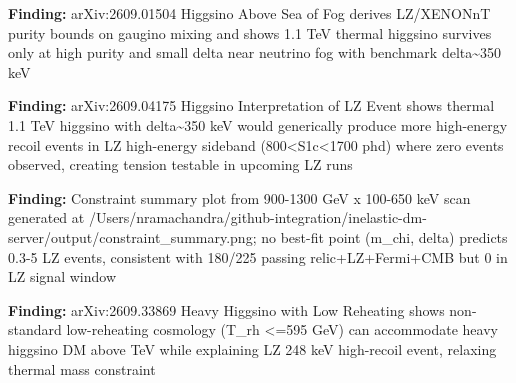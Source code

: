 \documentclass[11pt,a4paper]{article}
\begin{document}
\textbf{Finding:} arXiv:2609.01504 Higgsino Above Sea of Fog derives LZ/XENONnT purity bounds on gaugino mixing and shows 1.1 TeV thermal higgsino survives only at high purity and small delta near neutrino fog with benchmark delta\textasciitilde{}350 keV

\textbf{Finding:} arXiv:2609.04175 Higgsino Interpretation of LZ Event shows thermal 1.1 TeV higgsino with delta\textasciitilde{}350 keV would generically produce more high-energy recoil events in LZ high-energy sideband (800\textless{}S1c\textless{}1700 phd) where zero events observed, creating tension testable in upcoming LZ runs

\textbf{Finding:} Constraint summary plot from 900-1300 GeV x 100-650 keV scan generated at /Users/nramachandra/github-integration/inelastic-dm-server/output/constraint\_summary.png; no best-fit point (m\_chi, delta) predicts 0.3-5 LZ events, consistent with 180/225 passing relic+LZ+Fermi+CMB but 0 in LZ signal window

\textbf{Finding:} arXiv:2609.33869 Heavy Higgsino with Low Reheating shows non-standard low-reheating cosmology (T\_rh \textless{}=595 GeV) can accommodate heavy higgsino DM above TeV while explaining LZ 248 keV high-recoil event, relaxing thermal mass constraint
\end{document}
